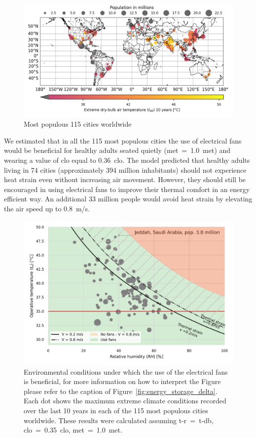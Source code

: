 \begin{figure}[thb!]
    \centering
    \includegraphics[width=\textwidth]{figures/map-population-temperature}
    \caption{Most populous 115 cities worldwide}
    \label{fig:map-population-temperature}
\end{figure}

We estimated that in all the 115 most populous cities the use of electrical fans would be beneficial for healthy adults seated quietly (\ac{met}~=~1.0~met) and wearing a value of \ac{clo} equal to 0.36~clo.
The  model predicted that healthy adults living in 74 cities (approximately 394 million inhabitants) should not experience heat strain even without increasing air movement.
However, they should still be encouraged in using electrical fans to improve their thermal comfort in an energy efficient way.
An additional 33 million people would avoid heat strain by elevating the air speed up to 0.8~m/s.

\begin{figure}[thb!]
    \centering
    \includegraphics[width=\textwidth]{figures/use_fans_and_population}
    \caption{Environmental conditions under which the use of the electrical fans is beneficial, for more information on how to interpret the Figure please refer to the caption of Figure~\ref{fig:energy_storage_delta}.
    Each dot shows the maximum extreme climate conditions recorded over the last 10 years in each of the 115 most populous cities worldwide.
    These results were calculated assuming \ac{t-r}~=~\ac{t-db}, \ac{clo}~=~0.35~clo, \ac{met}~=~1.0~met.}
    \label{fig:use_fans_and_population}
\end{figure}

